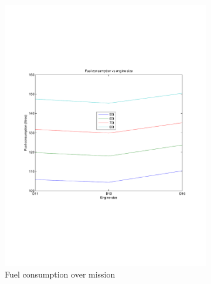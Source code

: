 \documentclass{article}
\begin{document}
\begin{figure}[h!]
\begin{subfigure}{.5\textwidth}
	\centering
	\includegraphics[width=\linewidth, clip=true, trim=45 185 65 208]{Figures/Engine_size_and_GCW/Fuel_consumption_vs_GCW_and_engine_size.pdf}
	\caption{Fuel consumption over mission}
\end{subfigure}
\begin{subfigure}{.5\textwidth}
	\centering

\end{subfigure}
\end{figure}
\end{document}
